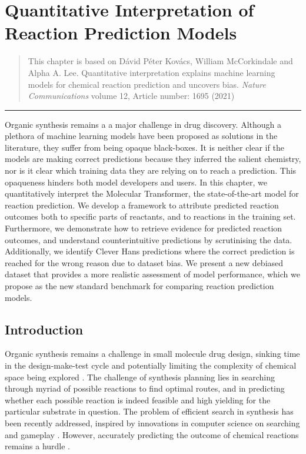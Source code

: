 \chapter{Quantitative Interpretation of Reaction Prediction Models}\label{ch:transformer}

\begin{quote}
    This chapter is based on Dávid Péter Kovács, William McCorkindale and Alpha A. Lee. Quantitative interpretation explains machine learning models for chemical reaction prediction and uncovers bias. \textit{Nature Communications} volume 12, Article number: 1695 (2021)
\end{quote}

\noindent\hfil\rule{0.5\textwidth}{.4pt}\hfil

Organic synthesis remains a a major challenge in drug discovery. Although a plethora of machine learning models have been proposed as solutions in the literature, they suffer from being opaque black-boxes. It is neither clear if the models are making correct predictions because they inferred the salient chemistry, nor is it clear which training data they are relying on to reach a prediction. This opaqueness hinders both model developers and users. In this chapter, we quantitatively interpret the Molecular Transformer, the state-of-the-art model for reaction prediction. We develop a framework to attribute predicted reaction outcomes both to specific parts of reactants, and to reactions in the training set. Furthermore, we demonstrate how to retrieve evidence for predicted reaction outcomes, and understand counterintuitive predictions by scrutinising the data. Additionally, we identify Clever Hans predictions where the correct prediction is reached for the wrong reason due to dataset bias. We present a new debiased dataset that provides a more realistic assessment of model performance, which we propose as the new standard benchmark for comparing reaction prediction models.

\section{\label{sec:intro}Introduction}

Organic synthesis remains a challenge in small molecule drug design, sinking time in the design-make-test cycle and potentially limiting the complexity of chemical space being explored \cite{blakemore2018organic,bostrom2018expanding}. The challenge of synthesis planning lies in searching through myriad of possible reactions to find optimal routes, and in predicting whether each possible reaction is indeed feasible and high yielding for the particular substrate in question. The problem of efficient search in synthesis has been recently addressed, inspired by innovations in computer science on searching and gameplay \cite{segler2017neural,segler2018planning,kishimoto2019depth,schreck2019learning, segler2019world}. However, accurately predicting the outcome of chemical reactions remains a hurdle \cite{Coley2018, Johansson2020, Struble2020}.

